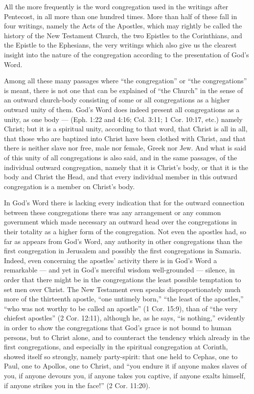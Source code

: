 All the more frequently is the word congregation used in the writings after Pentecost, in all more than one hundred times. More than half of these fall in four writings, namely the Acts of the Apostles, which may rightly be called the history of the New Testament Church, the two Epistles to the Corinthians, and the Epistle to the Ephesians, the very writings which also give us the clearest insight into the nature of the congregation according to the presentation of God’s Word.

Among all these many passages where “the congregation” or “the congregations” is meant, there is not one that can be explained of “the Church” in the sense of an outward church-body consisting of some or all congregations as a higher outward unity of them. God’s Word does indeed present all congregations as a unity, as one body — (Eph. 1:22 and 4:16; Col. 3:11; 1 Cor. 10:17, etc.) namely Christ; but it is a spiritual unity, according to that word, that Christ is all in all, that those who are baptized into Christ have been clothed with Christ, and that there is neither slave nor free, male nor female, Greek nor Jew. And what is said of this unity of all congregations is also said, and in the same passages, of the individual outward congregation, namely that it is Christ’s body, or that it is the body and Christ the Head, and that every individual member in this outward congregation is a member on Christ’s body.

In God’s Word there is lacking every indication that for the outward connection between these congregations there was any arrangement or any common government which made necessary an outward head over the congregations in their totality as a higher form of the congregation. Not even the apostles had, so far as appears from God’s Word, any authority in other congregations than the first congregation in Jerusalem and possibly the first congregations in Samaria. Indeed, even concerning the apostles’ activity there is in God’s Word a remarkable — and yet in God’s merciful wisdom well-grounded — silence, in order that there might be in the congregations the least possible temptation to set men over Christ. The New Testament even speaks disproportionately much more of the thirteenth apostle, “one untimely born,” “the least of the apostles,” “who was not worthy to be called an apostle” (1 Cor. 15:9), than of “the very chiefest apostles” (2 Cor. 12:11), although he, as he says, “is nothing,” evidently in order to show the congregations that God’s grace is not bound to human persons, but to Christ alone, and to counteract the tendency which already in the first congregations, and especially in the spiritual congregation at Corinth, showed itself so strongly, namely party-spirit: that one held to Cephas, one to Paul, one to Apollos, one to Christ, and “you endure it if anyone makes slaves of you, if anyone devours you, if anyone takes you captive, if anyone exalts himself, if anyone strikes you in the face!” (2 Cor. 11:20).

